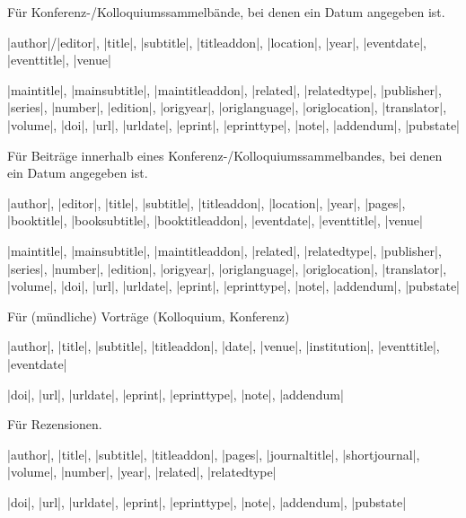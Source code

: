 \documentclass[a4paper,10pt,ngerman]{ltxdoc}
\begin{document}

 
  Für Konferenz-/Kolloquiumssammelbände, bei denen ein Datum angegeben ist. 
\begin{description}[topsep=0pt]
\item[Notwendig:] |author|/|editor|, |title|, |subtitle|, |titleaddon|, |location|, |year|, |eventdate|, |eventtitle|, |venue|
\item[Optional:] |maintitle|, |mainsubtitle|, |maintitleaddon|, |related|, |relatedtype|, |publisher|, |series|, |number|, |edition|, |origyear|, |origlanguage|, |origlocation|, |translator|, |volume|, |doi|, |url|, |urldate|, |eprint|, |eprinttype|, |note|, |addendum|, |pubstate|
\end{description}



  Für Beiträge innerhalb eines Konferenz-/Kolloquiumssammelbandes, bei denen ein Datum angegeben ist. 
\begin{description}[topsep=0pt]
\item[Notwendig:] |author|, |editor|, |title|, |subtitle|, |titleaddon|, |location|, |year|, |pages|, |booktitle|, |booksubtitle|, |booktitleaddon|, |eventdate|, |eventtitle|, |venue|
\item[Optional:] |maintitle|, |mainsubtitle|, |maintitleaddon|, |related|, |relatedtype|, |publisher|, |series|, |number|, |edition|, |origyear|, |origlanguage|, |origlocation|, |translator|, |volume|, |doi|, |url|, |urldate|, |eprint|, |eprinttype|, |note|, |addendum|, |pubstate|
\end{description}


 
  Für (mündliche) Vorträge (Kolloquium, Konferenz) 
\begin{description}[topsep=0pt]
\item[Notwendig:]  |author|, |title|, |subtitle|, |titleaddon|, |date|, |venue|, |institution|, |eventtitle|, |eventdate|
\item[Optional:] |doi|, |url|, |urldate|, |eprint|, |eprinttype|, |note|, |addendum| 
\end{description}



 Für Rezensionen.
\begin{description}[topsep=0pt]
\item[Notwendig:] |author|, |title|, |subtitle|, |titleaddon|, |pages|, |journaltitle|, |shortjournal|, |volume|, |number|, |year|, |related|, |relatedtype|
\item[Optional:] |doi|, |url|, |urldate|, |eprint|, |eprinttype|, |note|, |addendum|, |pubstate|
\end{description}
\end{document}
